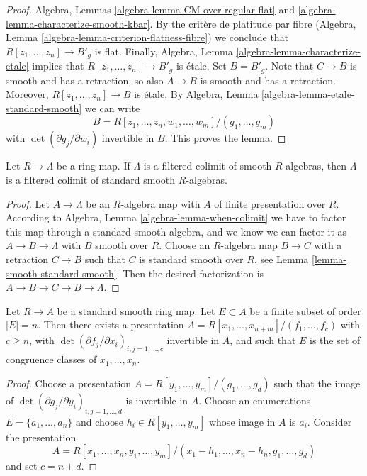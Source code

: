\begin{proof}
Algebra, Lemmas \ref{algebra-lemma-CM-over-regular-flat} and
\ref{algebra-lemma-characterize-smooth-kbar}. By the crit\`ere
de platitude par fibre
(Algebra, Lemma \ref{algebra-lemma-criterion-flatness-fibre})
we conclude that $R[z_1, \ldots, z_n] \to B'_g$ is flat.
Finally, Algebra, Lemma \ref{algebra-lemma-characterize-etale}
implies that $R[z_1, \ldots, z_n] \to B'_g$ is \'etale.
Set $B = B'_g$. Note that $C \to B$ is smooth and has a retraction,
so also $A \to B$ is smooth and has a retraction.
Moreover, $R[z_1, \ldots, z_n] \to B$ is \'etale.
By Algebra, Lemma \ref{algebra-lemma-etale-standard-smooth}
we can write
$$
B = R[z_1, \ldots, z_n, w_1, \ldots, w_m]/(g_1, \ldots, g_m)
$$
with $\det(\partial g_j/\partial w_i)$ invertible in $B$.
This proves the lemma.
\end{proof}

\begin{lemma}
\label{lemma-colimit-standard-smooth}
Let $R \to \Lambda$ be a ring map. If $\Lambda$ is a filtered colimit of
smooth $R$-algebras, then $\Lambda$ is a filtered colimit of standard
smooth $R$-algebras.
\end{lemma}

\begin{proof}
Let $A \to \Lambda$ be an $R$-algebra map with $A$
of finite presentation over $R$. According to
Algebra, Lemma \ref{algebra-lemma-when-colimit}
we have to factor this map through a standard smooth algebra, and
we know we can factor it as $A \to B \to \Lambda$ with $B$ smooth
over $R$. Choose an $R$-algebra map $B \to C$ with a retraction
$C \to B$ such that $C$ is standard smooth over $R$, see
Lemma \ref{lemma-smooth-standard-smooth}.
Then the desired factorization is $A \to B \to C \to B \to \Lambda$.
\end{proof}

\begin{lemma}
\label{lemma-standard-smooth-include-generators}
Let $R \to A$ be a standard smooth ring map.
Let $E \subset A$ be a finite subset of order $|E| = n$.
Then there exists a presentation
$A = R[x_1, \ldots, x_{n + m}]/(f_1, \ldots, f_c)$ with $c \geq n$,
with $\det(\partial f_j/\partial x_i)_{i, j = 1, \ldots, c}$
invertible in $A$, and such that $E$ is the set of congruence classes of
$x_1, \ldots, x_n$.
\end{lemma}

\begin{proof}
Choose a presentation $A = R[y_1, \ldots, y_m]/(g_1, \ldots, g_d)$
such that the image of
$\det(\partial g_j/\partial y_i)_{i, j = 1, \ldots, d}$
is invertible in $A$. Choose an enumerations $E = \{a_1, \ldots, a_n\}$
and choose $h_i \in R[y_1, \ldots, y_m]$ whose image in $A$ is $a_i$.
Consider the presentation
$$
A = R[x_1, \ldots, x_n, y_1, \ldots, y_m]/
(x_1 - h_1, \ldots, x_n - h_n, g_1, \ldots, g_d)
$$
and set $c = n + d$.
\end{proof}


